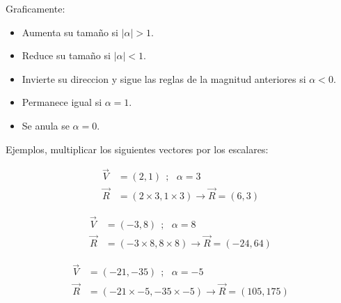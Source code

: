     Graficamente:
    \begin{itemize}
        \item Aumenta su tamaño si $|\alpha| >1$.
        \item Reduce su tamaño si $|\alpha| <1$.

        \item Invierte su direccion y  sigue las reglas de la magnitud anteriores
            si $\alpha<0$.

        \item Permanece igual si $\alpha=1$.
        \item Se anula se $\alpha = 0$.
    \end{itemize}




    Ejemplos, multiplicar los siguientes vectores por los escalares:

    \begin{align*}
        \vec{V}& =(2,1)  \ \ ;\ \ \  \alpha =3 		\\
        \vec{R}&= (2\times3,1\times3 )   \rightarrow \vec{R}= (6,3 )
    \end{align*}

    \begin{align*}
        \vec{V}& =(-3,8)  \ \ ;\ \ \  \alpha = 8		\\
        \vec{R}&= (-3 \times8,8 \times8 )   \rightarrow \vec{R}= (-24,64 )
    \end{align*}

    \begin{align*}
        \vec{V}& =(-21,-35)  \ \ ;\ \ \ \alpha = -5		\\
        \vec{R}&= (-21 \times-5,-35 \times-5)  \rightarrow \vec{R} = (105,175 )
    \end{align*}





